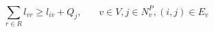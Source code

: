 \begin{equation} \label{eq:18}
\sum_{r \in R}l_{vr} \geq l_{iv} + Q_j,~~~~~~~~ v \in V, j\in N_v^P, (i,j)\in E_v                                             
\end{equation}  
